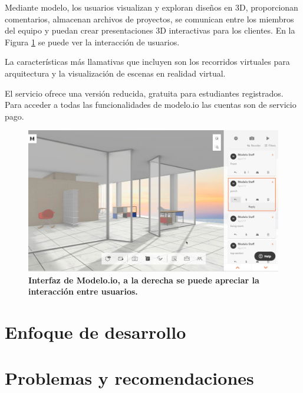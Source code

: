 Mediante modelo, los usuarios visualizan y exploran diseños en 3D, proporcionan comentarios, almacenan archivos de proyectos, se comunican entre los miembros del equipo y puedan crear presentaciones 3D interactivas para los clientes. En la Figura \ref{fig:modelo.io} se puede ver la interacción de usuarios.

La características más llamativas que incluyen son los recorridos virtuales para arquitectura y la visualización de escenas en realidad virtual.

El servicio ofrece una versión reducida, gratuita para estudiantes registrados. Para acceder a todas las funcionalidades de modelo.io las cuentas son de servicio pago.

\begin{figure}[h]
\includegraphics[width=14cm]{Img/WEB/web-modelo.jpg}
\centering
\caption{\textbf{ \footnotesize{Interfaz de Modelo.io, a la derecha se puede apreciar la interacción entre usuarios.}}}
\label{fig:modelo.io}
\end{figure}

\clearpage

\section{Enfoque de desarrollo}




\section{Problemas y recomendaciones
}